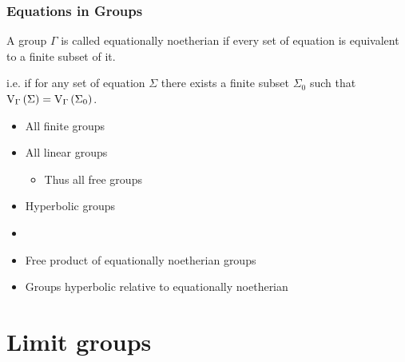 \documentclass{beamer}[10]
\newcommand{\sol}{\text{V}_{\Gamma}}
\begin{document}
\begin{frame}

    \frametitle{Equations in Groups}
    \pause
    \begin{definition}
        A group $\Gamma$ is called equationally noetherian if  every set of equation is equivalent to a finite subset of it. \pause
        
        i.e. if for any set of equation $\Sigma$ there exists a finite subset $\Sigma_0$ such that $\sol\rb{\Sigma} = \sol\rb{\Sigma_0}$.
    \end{definition}
    \pause
    \begin{example}\pause
        \begin{multicols}{2}
        \begin{itemize}
            \item All finite groups \pause
            \item All linear groups\pause
                \begin{itemize}
                    \item Thus all free groups\pause
                \end{itemize}
            \item Hyperbolic groups\\\pause
            \item[] 
            \item Free product of equationally noetherian groups\pause
            \item Groups hyperbolic relative to equationally noetherian
        \end{itemize}
        \end{multicols}
    \end{example}

\end{frame}

\section{Limit groups}
\end{document}
